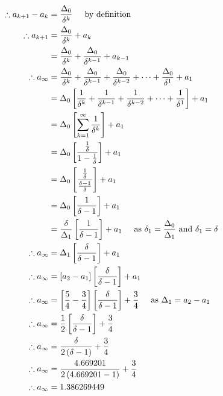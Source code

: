 \documentclass[a4paper]{article}
\begin{document}
\begin{enumerate}[label=\textbf{\arabic*.}]
\begin{enumerate}
		\begin{align*}
		\therefore a_{k+1} - a_k & = \frac{\Delta_0}{\delta^{k}} \hspace{5mm} \text{by definition}\\
		\therefore a_{k+1} & = \frac{\Delta_0}{\delta^{k}} + a_k\\
		& = \frac{\Delta_0}{\delta^{k}} + \frac{\Delta_0}{\delta^{k-1}} + a_{k-1}\\
		\therefore a_{\infty} & = \frac{\Delta_0}{\delta^{k}} + \frac{\Delta_0}{\delta^{k-1}} + \frac{\Delta_0}{\delta^{k-2}} + \dots + \frac{\Delta_0}{\delta^{1}} + a_1\\
		& = \Delta_0 \left[\frac{1}{\delta^{k}} + \frac{1}{\delta^{k-1}} + \frac{1}{\delta^{k-2}} + \dots + \frac{1}{\delta^{1}} \right] + a_1\\
		& = \Delta_0 \left[\sum_{k=1}^{\infty}\frac{1}{\delta^{k}} \right] + a_1\\
		& = \Delta_0 \left[\frac{\frac{1}{\delta}}{1-\frac{1}{\delta}} \right] + a_1\\
		& = \Delta_0 \left[\frac{\frac{1}{\delta}}{\frac{\delta - 1}{\delta}} \right] + a_1\\
		& = \Delta_0 \left[\frac{1}{\delta - 1} \right] + a_1\\
		& = \frac{\delta}{\Delta_1} \left[\frac{1}{\delta - 1} \right] + a_1 \hspace{5mm} \text{as } \delta_1 = \frac{\Delta_{0}}{\Delta_{1}} \text{ and } \delta_1 = \delta\\
		\therefore a_{\infty} & = \Delta_1 \left[\frac{\delta}{\delta - 1} \right] + a_1 \\
		\therefore a_{\infty} & = \left[a_2 - a_1 \right] \left[\frac{\delta}{\delta - 1} \right] + a_1 \\
		\therefore a_{\infty} & = \left[\frac{5}{4} - \frac{3}{4} \right] \left[\frac{\delta}{\delta - 1} \right] + \frac{3}{4} \hspace{5mm} \text{as } \Delta_1 = a_2 - a_1\\
		\therefore a_{\infty} & = \frac{1}{2} \left[\frac{\delta}{\delta - 1} \right] + \frac{3}{4}\\
		\therefore a_{\infty} & = \frac{\delta}{2\left(\delta - 1 \right)} + \frac{3}{4}\\
		\therefore a_{\infty} & = \frac{4.669201}{2\left(4.669201 - 1 \right)} + \frac{3}{4}\\
		\therefore a_{\infty} & = 1.386269449\\
		\end{align*}










	\end{enumerate}








\end{enumerate}
\end{document}
